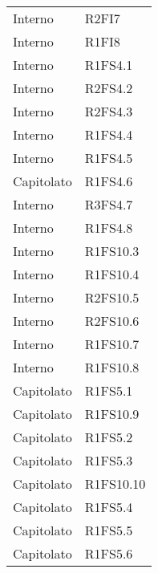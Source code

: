 {\begin{longtable}{ C{4cm} C{4cm}}
Interno & R2FI7\\


Interno & R1FI8\\

Interno & R1FS4.1\\

Interno & R2FS4.2\\

Interno & R2FS4.3\\

Interno & R1FS4.4\\

Interno & R1FS4.5\\

Capitolato & R1FS4.6\\

Interno & R3FS4.7\\

Interno & R1FS4.8\\


Interno & R1FS10.3\\

Interno & R1FS10.4\\

Interno & R2FS10.5\\

Interno & R2FS10.6\\

Interno & R1FS10.7\\

Interno & R1FS10.8\\


Capitolato & R1FS5.1\\

Capitolato & R1FS10.9\\

Capitolato & R1FS5.2\\

Capitolato & R1FS5.3\\

Capitolato & R1FS10.10\\

Capitolato & R1FS5.4\\

Capitolato & R1FS5.5\\


Capitolato & R1FS5.6\\


\end{longtable}}
